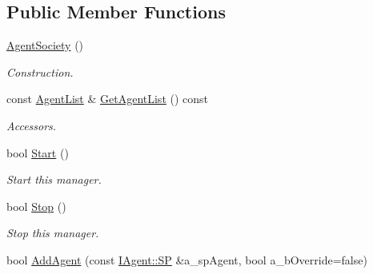 \subsection*{Public Member Functions}
\begin{DoxyCompactItemize}
\item 
\mbox{\label{class_agent_society_a66fc039ea4050420d546cb9e7f7e508a}} 
\hyperlink{class_agent_society_a66fc039ea4050420d546cb9e7f7e508a}{Agent\+Society} ()
\begin{DoxyCompactList}\small\item\em Construction. \end{DoxyCompactList}\item 
\mbox{\label{class_agent_society_ab19c6fddacfee7e1b65437eecc04fc51}} 
const \hyperlink{class_agent_society_a97390fc3b2f25357b0b771ccaa919f8c}{Agent\+List} \& \hyperlink{class_agent_society_ab19c6fddacfee7e1b65437eecc04fc51}{Get\+Agent\+List} () const
\begin{DoxyCompactList}\small\item\em Accessors. \end{DoxyCompactList}\item 
\mbox{\label{class_agent_society_af72ffccc3b4149c3552e8d14738cdc6b}} 
bool \hyperlink{class_agent_society_af72ffccc3b4149c3552e8d14738cdc6b}{Start} ()
\begin{DoxyCompactList}\small\item\em Start this manager. \end{DoxyCompactList}\item 
\mbox{\label{class_agent_society_ad6959698b4d5ee542ff526cf61f3342f}} 
bool \hyperlink{class_agent_society_ad6959698b4d5ee542ff526cf61f3342f}{Stop} ()
\begin{DoxyCompactList}\small\item\em Stop this manager. \end{DoxyCompactList}\item 
\mbox{\label{class_agent_society_a94441afad0798946e500df24ee207c79}} 
bool \hyperlink{class_agent_society_a94441afad0798946e500df24ee207c79}{Add\+Agent} (const \hyperlink{class_i_agent_a9e88f0528d282c33200a2d43d1c29a73}{I\+Agent\+::\+SP} \&a\+\_\+sp\+Agent, bool a\+\_\+b\+Override=false)

\end{DoxyCompactItemize}
